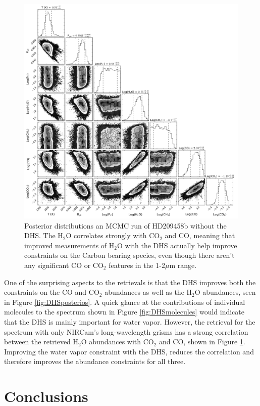 \documentclass[iop]{emulateapj}
\begin{document}
\begin{figure}
\centering
\includegraphics[width=1.0\textwidth]{HD209458b_solar_clear_1trans_nc_only_subset.png}
\caption{Posterior distributions an MCMC run of HD209458b without the DHS.
The H$_2$O correlates strongly with CO$_2$ and CO, meaning that improved measurements of H$_2$O with the DHS actually help improve constraints on the Carbon bearing species, even though there aren't any significant CO or CO$_2$ features in the 1-2$\mu$m range.}\label{fig:cornerRun}
\end{figure}

One of the surprising aspects to the retrievals is that the DHS improves both the constraints on the CO and CO$_2$ abundances as well as the H$_2$O abundances, seen in Figure \ref{fig:DHSposterios}.
A quick glance at the contributions of individual molecules to the spectrum shown in Figure \ref{fig:DHSmolecules} would indicate that the DHS is mainly important for water vapor.
However, the retrieval for the spectrum with only NIRCam's long-wavelength grisms has a strong correlation between the retrieved H$_2$O abundances with CO$_2$ and CO, shown in Figure \ref{fig:cornerRun}.
Improving the water vapor constraint with the DHS, reduces the correlation and therefore improves the abundance constraints for all three.

\section{Conclusions}
\end{document}
